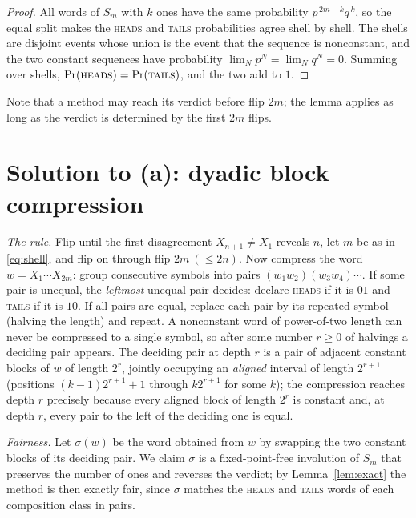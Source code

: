 \documentclass[11pt]{article}
\theoremstyle{remark}
\newcommand{\head}{\textnormal{\textsc{heads}}}
\newcommand{\tail}{\textnormal{\textsc{tails}}}
\begin{document}
\begin{proof}
All words of $S_m$ with $k$ ones have the same probability
$p^{\,2m-k}q^{\,k}$, so the equal split makes the \head{} and \tail{}
probabilities agree shell by shell. The shells are disjoint events whose
union is the event that the sequence is nonconstant, and the two constant
sequences have probability $\lim_N p^N=\lim_N q^N=0$. Summing over shells,
$\Pr(\head)=\Pr(\tail)$, and the two add to $1$.
\end{proof}

Note that a method may reach its verdict before flip $2m$; the lemma applies
as long as the verdict is determined by the first $2m$ flips.

\section*{Solution to (a): dyadic block compression}

\emph{The rule.} Flip until the first disagreement $X_{n+1}\ne X_1$ reveals
$n$, let $m$ be as in \eqref{eq:shell}, and flip on through flip
$2m\ (\le 2n)$. Now compress the word $w=X_1\cdots X_{2m}$: group consecutive
symbols into pairs $(w_1w_2)(w_3w_4)\cdots$. If some pair is unequal, the
\emph{leftmost} unequal pair decides: declare \head{} if it is $01$ and
\tail{} if it is $10$. If all pairs are equal, replace each pair by its
repeated symbol (halving the length) and repeat. A nonconstant word of
power-of-two length can never be compressed to a single symbol, so after some
number $r\ge 0$ of halvings a deciding pair appears. The deciding pair at
depth $r$ is a pair of adjacent constant blocks of $w$ of length $2^r$,
jointly occupying an \emph{aligned} interval of length $2^{r+1}$ (positions
$(k-1)2^{r+1}+1$ through $k2^{r+1}$ for some $k$); the compression reaches
depth $r$ precisely because every aligned block of length $2^r$ is constant
and, at depth $r$, every pair to the left of the deciding one is equal.

\emph{Fairness.} Let $\sigma(w)$ be the word obtained from $w$ by swapping
the two constant blocks of its deciding pair. We claim $\sigma$ is a
fixed-point-free involution of $S_m$ that preserves the number of ones and
reverses the verdict; by Lemma~\ref{lem:exact} the method is then exactly
fair, since $\sigma$ matches the \head{} and \tail{} words of each
composition class in pairs.
\end{document}
